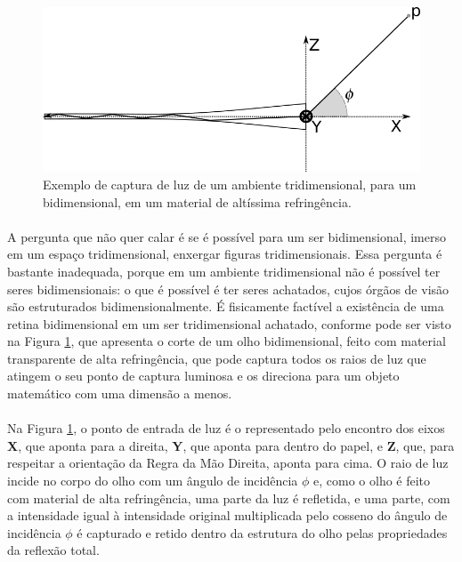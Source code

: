 \documentclass{article}
\begin{document}
	\begin{figure}
		\centering
		\includegraphics[scale=0.6]{refr-captura-luz}
		\caption{Exemplo de captura de luz de um ambiente tridimensional, para um bidimensional, em um material de altíssima refringência.}
		\label{fig:refr-cap}
	\end{figure}

	\paragraph{}
	A pergunta que não quer calar é se é possível para um ser bidimensional, imerso em um espaço tridimensional, enxergar figuras tridimensionais. Essa pergunta é bastante inadequada, porque em um ambiente tridimensional não é possível ter seres bidimensionais: o que é possível é ter seres achatados, cujos órgãos de visão são estruturados bidimensionalmente. É fisicamente factível a existência de uma retina bidimensional em um ser tridimensional achatado, conforme pode ser visto na Figura \ref{fig:refr-cap}, que apresenta o corte de um olho bidimensional, feito com material transparente de alta refringência, que pode captura todos os raios de luz que atingem o seu ponto de captura luminosa e os direciona para um objeto matemático com uma dimensão a menos.
	
	\paragraph{}
	Na Figura \ref{fig:refr-cap}, o ponto de entrada de luz é o representado pelo encontro dos eixos \textbf{X}, que aponta para a direita, \textbf{Y}, que aponta para dentro do papel, e \textbf{Z}, que, para respeitar a orientação da Regra da Mão Direita, aponta para cima. O raio de luz incide no corpo do olho com um ângulo de incidência $\phi$ e, como o olho é feito com material de alta refringência, uma parte da luz é refletida, e uma parte, com a intensidade igual à intensidade original multiplicada pelo cosseno do ângulo de incidência $\phi$ é capturado e retido dentro da estrutura do olho pelas propriedades da reflexão total.
	
\end{document}
